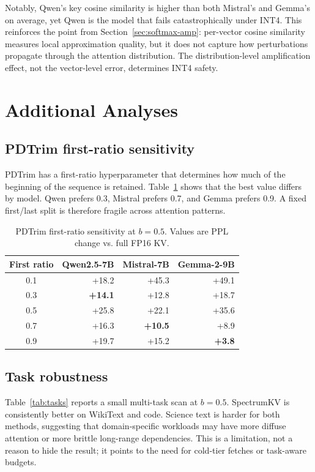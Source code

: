 \documentclass[11pt]{article}
\newcommand{\method}{SpectrumKV}
\newcommand{\budget}{b}
\theoremstyle{plain}
\theoremstyle{definition}
\begin{document}
Notably, Qwen's key cosine similarity is higher than both Mistral's and Gemma's on average, yet Qwen is the model that fails catastrophically under INT4.  This reinforces the point from Section~\ref{sec:softmax-amp}: per-vector cosine similarity measures local approximation quality, but it does not capture how perturbations propagate through the attention distribution.  The distribution-level amplification effect, not the vector-level error, determines INT4 safety.

\section{Additional Analyses}
\label{sec:additional}

\subsection{PDTrim first-ratio sensitivity}
PDTrim has a first-ratio hyperparameter that determines how much of the beginning of the sequence is retained.  Table~\ref{tab:fr} shows that the best value differs by model.  Qwen prefers 0.3, Mistral prefers 0.7, and Gemma prefers 0.9.  A fixed first/last split is therefore fragile across attention patterns.

\begin{table}[h]
\centering
\caption{PDTrim first-ratio sensitivity at $\budget=0.5$.  Values are PPL change vs. full FP16 KV.}
\label{tab:fr}
\small
\begin{tabular}{crrr}
\toprule
First ratio & Qwen2.5-7B & Mistral-7B & Gemma-2-9B \\
\midrule
0.1 & +18.2 & +45.3 & +49.1 \\
0.3 & \textbf{+14.1} & +12.8 & +18.7 \\
0.5 & +25.8 & +22.1 & +35.6 \\
0.7 & +16.3 & \textbf{+10.5} & +8.9 \\
0.9 & +19.7 & +15.2 & \textbf{+3.8} \\
\bottomrule
\end{tabular}
\end{table}

\subsection{Task robustness}
Table~\ref{tab:tasks} reports a small multi-task scan at $\budget=0.5$.  \method{} is consistently better on WikiText and code.  Science text is harder for both methods, suggesting that domain-specific workloads may have more diffuse attention or more brittle long-range dependencies.  This is a limitation, not a reason to hide the result; it points to the need for cold-tier fetches or task-aware budgets.
\end{document}
